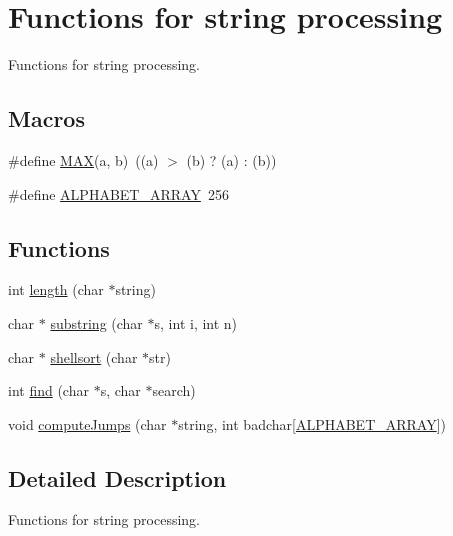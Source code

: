 \hypertarget{group__string__functions}{}\section{Functions for string processing}
\label{group__string__functions}


Functions for string processing.  


\subsection*{Macros}
\begin{DoxyCompactItemize}
\item 
\#define \hyperlink{group__string__functions_gafa99ec4acc4ecb2dc3c2d05da15d0e3f}{M\+A\+X}(a,  b)~((a)   $>$ (b) ? (a) \+: (b))
\item 
\#define \hyperlink{group__string__functions_ga365663a53db95d4a05469a135a8cb3f3}{A\+L\+P\+H\+A\+B\+E\+T\+\_\+\+A\+R\+R\+A\+Y}~256
\end{DoxyCompactItemize}
\subsection*{Functions}
\begin{DoxyCompactItemize}
\item 
int \hyperlink{group__string__functions_ga84261984e4b1bc441dcbf4dfef6f46fd}{length} (char $\ast$string)
\item 
char $\ast$ \hyperlink{group__string__functions_gab1e0741be6d2932577a358795bfaff5b}{substring} (char $\ast$s, int i, int n)
\item 
char $\ast$ \hyperlink{group__string__functions_ga1244cd9a8538e43d4a96e3d8c7f1e896}{shellsort} (char $\ast$str)
\item 
int \hyperlink{group__string__functions_ga97d8398ed0576999669759e6aaf326f2}{find} (char $\ast$s, char $\ast$search)
\item 
void \hyperlink{group__string__functions_ga63253522e27ba6f973bd3e8d049af997}{compute\+Jumps} (char $\ast$string, int badchar\mbox{[}\hyperlink{group__string__functions_ga365663a53db95d4a05469a135a8cb3f3}{A\+L\+P\+H\+A\+B\+E\+T\+\_\+\+A\+R\+R\+A\+Y}\mbox{]})
\end{DoxyCompactItemize}


\subsection{Detailed Description}
Functions for string processing. 


